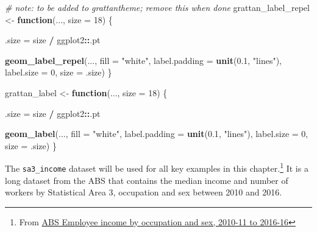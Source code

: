 \documentclass[]{book}
\newenvironment{Shaded}{\begin{snugshade}}{\end{snugshade}}
\newcommand{\CommentTok}[1]{\textcolor[rgb]{0.56,0.35,0.01}{\textit{#1}}}
\newcommand{\ControlFlowTok}[1]{\textcolor[rgb]{0.13,0.29,0.53}{\textbf{#1}}}
\newcommand{\DataTypeTok}[1]{\textcolor[rgb]{0.13,0.29,0.53}{#1}}
\newcommand{\DecValTok}[1]{\textcolor[rgb]{0.00,0.00,0.81}{#1}}
\newcommand{\FloatTok}[1]{\textcolor[rgb]{0.00,0.00,0.81}{#1}}
\newcommand{\KeywordTok}[1]{\textcolor[rgb]{0.13,0.29,0.53}{\textbf{#1}}}
\newcommand{\NormalTok}[1]{#1}
\newcommand{\OperatorTok}[1]{\textcolor[rgb]{0.81,0.36,0.00}{\textbf{#1}}}
\newcommand{\StringTok}[1]{\textcolor[rgb]{0.31,0.60,0.02}{#1}}
\begin{document}
\begin{Shaded}
\begin{Highlighting}[]
\CommentTok{# note: to be added to grattantheme; remove this when done}
\NormalTok{grattan_label_repel <-}\StringTok{ }\ControlFlowTok{function}\NormalTok{(..., }\DataTypeTok{size =} \DecValTok{18}\NormalTok{) \{}

\NormalTok{  .size =}\StringTok{ }\NormalTok{size }\OperatorTok{/}\StringTok{ }\NormalTok{ggplot2}\OperatorTok{::}\NormalTok{.pt}
  
  \KeywordTok{geom_label_repel}\NormalTok{(..., }
                   \DataTypeTok{fill =} \StringTok{"white"}\NormalTok{,}
                   \DataTypeTok{label.padding =} \KeywordTok{unit}\NormalTok{(}\FloatTok{0.1}\NormalTok{, }\StringTok{"lines"}\NormalTok{), }
                   \DataTypeTok{label.size =} \DecValTok{0}\NormalTok{,}
                   \DataTypeTok{size =}\NormalTok{ .size)}
\NormalTok{\}}


\NormalTok{grattan_label <-}\StringTok{ }\ControlFlowTok{function}\NormalTok{(..., }\DataTypeTok{size =} \DecValTok{18}\NormalTok{) \{}

\NormalTok{  .size =}\StringTok{ }\NormalTok{size }\OperatorTok{/}\StringTok{ }\NormalTok{ggplot2}\OperatorTok{::}\NormalTok{.pt}
  
  \KeywordTok{geom_label}\NormalTok{(..., }
                   \DataTypeTok{fill =} \StringTok{"white"}\NormalTok{,}
                   \DataTypeTok{label.padding =} \KeywordTok{unit}\NormalTok{(}\FloatTok{0.1}\NormalTok{, }\StringTok{"lines"}\NormalTok{), }
                   \DataTypeTok{label.size =} \DecValTok{0}\NormalTok{,}
                   \DataTypeTok{size =}\NormalTok{ .size)}
\NormalTok{\}}
\end{Highlighting}
\end{Shaded}

The \texttt{sa3\_income} dataset will be used for all key examples in this chapter.\footnote{From \href{https://www.abs.gov.au/AUSSTATS/abs@.nsf/DetailsPage/6524.0.55.0022011-2016?OpenDocument}{ABS Employee income by occupation and sex, 2010-11 to 2016-16}} It is a long dataset from the ABS that contains the median income and number of workers by Statistical Area 3, occupation and sex between 2010 and 2016.

\begin{Shaded}
\end{Shaded}
\end{document}
